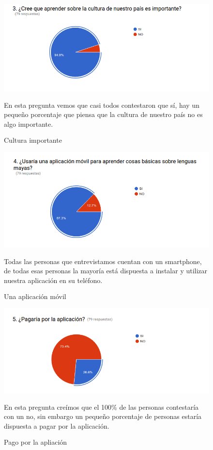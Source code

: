 \documentclass[a4paper,openright,11pt]{article}
\begin{document}
\begin{figure}
	\centering
	\includegraphics[width=1.0\textwidth]{e3}
	\caption{Cultura importante}
	\label{fig:e3}
	En esta pregunta vemos que casi todos contestaron que sí, hay un pequeño porcentaje que piensa que la cultura de nuestro país no es algo importante.
\end{figure}
\begin{figure}
	\centering
	\includegraphics[width=1.0\textwidth]{e4}
	\caption{Una aplicación móvil}
	\label{fig:e4}
	Todas las personas que entrevistamos cuentan con un smartphone, de todas esas personas la mayoría está dispuesta a instalar y utilizar nuestra aplicación en su teléfono.
\end{figure}
\begin{figure}
	\centering
	\includegraphics[width=1.0\textwidth]{e5}
	\caption{Pago por la apliación}
	\label{fig:e5}
	En esta pregunta creímos que el 100\% de las personas contestaría con un no, sin embargo un pequeño porcentaje de personas estaría dispuesta a pagar por la aplicación.
\end{figure}
\end{document}
